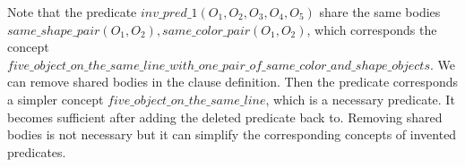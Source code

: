 \documentclass[
]{ceurart}
\begin{document}
Note that the predicate $ inv\_pred\_1(O_1,O_2,O_3,O_4,O_5) $ share the same bodies $ same\_shape\_pair(O_1,O_2), same\_color\_pair(O_1,O_2) $, which corresponds the concept $ five\_object\_on\_the\_same\_line\_with\_one\_pair\_of\_same\_color\_and\_shape\_objects $. We can remove shared bodies in the clause definition. Then the predicate corresponds a simpler concept $ five\_object\_on\_the\_same\_line $, which is a necessary predicate. It becomes sufficient after adding the deleted predicate back to. Removing shared bodies is not necessary but it can simplify the corresponding concepts of invented predicates. 
 

\begin{figure}[!htb]
	\centering
	

\end{figure}
\end{document}

